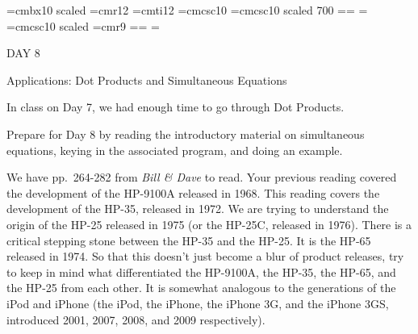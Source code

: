 
\def\folio{\ifnum\pageno>0 \number\pageno \else
   \ifnum\pageno<0 \romannumeral-\pageno \else\fi\fi}

\font\largebf=cmbx10  scaled 
\font\largerm=cmr12
\font\largeit=cmti12
\font\tensc=cmcsc10
\font\sevensc=cmcsc10 scaled 700
\newfam\scfam \def\sc{\fam\scfam\tensc}
\textfont\scfam=\tensc \scriptfont\scfam=\sevensc
\scriptscriptfont\scfam=\sevensc
\font\largesc=cmcsc10 scaled 
\font\ninerm=cmr9
\newfam\srfam \def\sr{\fam\srfam\ninerm}
\textfont\srfam=\ninerm \scriptfont\srfam=\sevenrm
\scriptscriptfont\srfam=\fiverm




\null\vskip36pt

\centerline{\largerm DAY 8}
\nobreak\bigskip

\centerline{\largeit Applications: Dot Products and Simultaneous Equations}
\nobreak\bigskip

\nobreak\bigskip

\noindent In class on Day 7, we had enough time to go through Dot Products.

\bigskip

\nobreak\bigskip

\noindent Prepare for Day 8 by reading the introductory material on simultaneous equations, keying in the associated program, and doing an example.

\bigskip

\nobreak\bigskip

\noindent We have pp.~264-282 from {\it Bill \& Dave} to read. Your previous reading covered the development of the HP-9100A released in 1968. This reading covers the development of the HP-35, released in 1972. We are trying to understand the origin of the HP-25 released in 1975 (or the HP-25C, released in 1976). There is a critical stepping stone between the HP-35 and the HP-25. It is the HP-65 released in 1974. So that this doesn't just become a blur of product releases, try to keep in mind what differentiated the HP-9100A, the HP-35, the HP-65, and the HP-25 from each other. It is somewhat analogous to the generations of the iPod and iPhone (the iPod, the iPhone, the iPhone 3G, and the iPhone 3GS, introduced 2001, 2007, 2008, and 2009 respectively).

\bigskip

